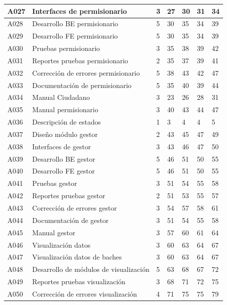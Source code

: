 \documentclass[12pt,twoside]{article}
\begin{document}
\begin{longtable}{|l|p{5cm}|l|l|l|l|l|}
    A027 & Interfaces de permisionario & 3 & 27 & 30 & 31 & 34 \\ \hline
    A028 & Desarrollo BE permisionario & 5 & 30 & 35 & 34 & 39 \\ \hline
    A029 & Desarrollo FE permisionario & 5 & 30 & 35 & 34 & 39 \\ \hline
    A030 & Pruebas permisionario & 3 & 35 & 38 & 39 & 42 \\ \hline
    A031 & Reportes pruebas permisionario & 2 & 35 & 37 & 39 & 41 \\ \hline
    A032 & Corrección de errores permisionario & 5 & 38 & 43 & 42 & 47 \\ \hline
    A033 & Documentación de permisionario & 5 & 35 & 40 & 39 & 44 \\ \hline
    A034 & Manual Ciudadano & 3 & 23 & 26 & 28 & 31 \\ \hline
    A035 & Manual permisionario & 3 & 40 & 43 & 44 & 47 \\ \hline
    A036 & Descripción de estados & 1 & 3 & 4 & 4 & 5 \\ \hline
    A037 & Diseño módulo gestor & 2 & 43 & 45 & 47 & 49 \\ \hline
    A038 & Interfaces de gestor & 3 & 43 & 46 & 47 & 50 \\ \hline
    A039 & Desarrollo BE gestor & 5 & 46 & 51 & 50 & 55 \\ \hline
    A040 & Desarrollo FE gestor & 5 & 46 & 51 & 50 & 55 \\ \hline
    A041 & Pruebas gestor & 3 & 51 & 54 & 55 & 58 \\ \hline
    A042 & Reportes pruebas gestor & 2 & 51 & 53 & 55 & 57 \\ \hline
    A043 & Corrección de errores gestor & 3 & 54 & 57 & 58 & 61 \\ \hline
    A044 & Documentación de gestor & 3 & 51 & 54 & 55 & 58 \\ \hline
    A045 & Manual gestor & 3 & 57 & 60 & 61 & 64 \\ \hline
    A046 & Visualización datos & 3 & 60 & 63 & 64 & 67 \\ \hline
    A047 & Visualización datos de baches & 3 & 60 & 63 & 64 & 67 \\ \hline
    A048 & Desarrollo de módulos de visualización & 5 & 63 & 68 & 67 & 72 \\ \hline
    A049 & Reportes pruebas visualización & 3 & 68 & 71 & 72 & 75 \\ \hline
    A050 & Corrección de errores visualización & 4 & 71 & 75 & 75 & 79 \\ \hline

\end{longtable}
\end{document}
